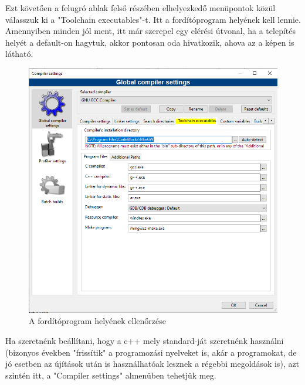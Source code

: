 Ezt követően a felugró ablak felső részében elhelyezkedő menüpontok közül válasszuk ki a "Toolchain executables"-t. Itt a fordítóprogram helyének kell lennie. Amennyiben minden jól ment, itt már szerepel egy elérési útvonal, ha a telepítés helyét a default-on hagytuk, akkor pontosan oda hivatkozik, ahova az a képen is látható.

\begin{figure}[H]
	\centering
	\includegraphics[width=1.0\linewidth]{images/bevezetes/check_compiler_02}
	\caption{A fordítóprogram helyének ellenőrzése}
	\label{fig:choose}
\end{figure}

Ha szeretnénk beállítani, hogy a c++ mely standard-ját szeretnénk használni (bizonyos években "frissítik" a programozási nyelveket is, akár a programokat, de jó esetben az újítások után is használhatóak lesznek a régebbi megoldások is), azt szintén itt, a "Compiler settings" almenüben tehetjük meg.

